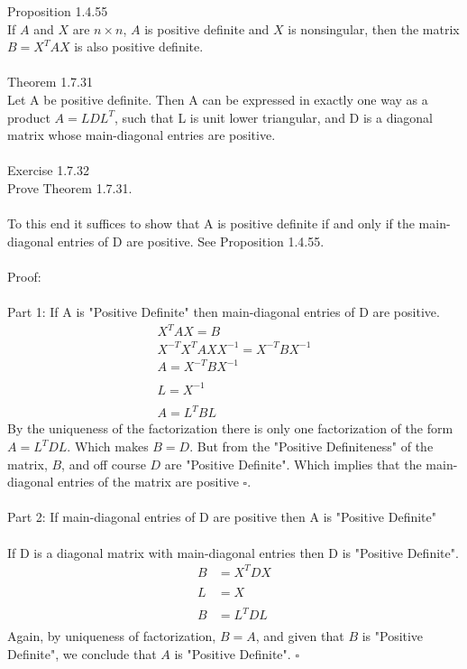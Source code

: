 \documentclass[10pt,a4paper]{article}
\author{Daniel Frederico Lins Leite}
\begin{document}
	Proposition 1.4.55\\
	If $A$ and $X$ are $n \times n$, $A$ is positive definite and $X$ is nonsingular, then the matrix $B = X^TAX$ is also positive definite.\\
	\\
	Theorem 1.7.31\\
	Let A be positive definite. Then A can be expressed in exactly one 
	way as a product $A = LDL^T$, such that L is unit lower triangular, and D is a 
	diagonal matrix whose main-diagonal entries are positive. \\
	\\
	Exercise 1.7.32\\
	Prove Theorem 1.7.31.\\
	\\
	To this end it suffices to show that A is positive definite if and only if the main-diagonal entries of D are positive. See Proposition 1.4.55.\\
	\\
	Proof:\\
	\\
	Part 1: If A is "Positive Definite" then main-diagonal entries of D are positive.
	\begin{align*}
		X^TAX = B\\
		X^{-T}X^TAXX^{-1} = X^{-T}BX^{-1}\\
		A = X^{-T}BX^{-1}\\
		\\
		L = X^{-1}\\
		\\
		A = L^TBL
	\end{align*}
	By the uniqueness of the factorization there is only one factorization of the form $A = L^TDL$. Which makes $B=D$. But from the "Positive Definiteness" of the matrix, $B$, and off course $D$ are "Positive Definite".
	Which implies that the main-diagonal entries of the matrix are positive $\square$.
	\\
	\\
	Part 2: If main-diagonal entries of D are positive then A is "Positive Definite"\\	
	\\
	If D is a diagonal matrix with  main-diagonal entries then D is "Positive Definite".
	\begin{align*}			
		B &= X^TDX\\
		\\
		L &= X\\
		\\
		B &= L^TDL\\
	\end{align*}	
	Again, by uniqueness of factorization, $B=A$, and given that $B$ is "Positive Definite", we conclude that $A$ is "Positive Definite". $\square$
\end{document}

